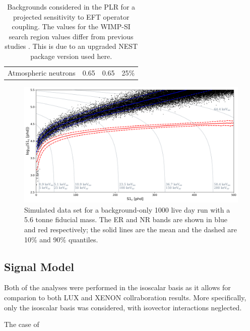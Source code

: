 \begin{table}[]
\begin{tabular}{c|c|c|c}
        Atmospheric neutrons                         & 0.65                   & 0.65                    & 25\% \cite{atmospheric_neutrinos_rate_ref}      
    \end{tabular}
    \caption{Backgrounds considered in the PLR for a projected sensitivity to EFT operator coupling. The values for the WIMP-SI search region values differ from previous studies \cite{LZ_projected_sensitivity_paper_ref,LZ_Ibles_LZStats_Thesis_ref}. This is due to an upgraded NEST package version used here.}
    \label{tab:projected_lz_backgrounds}
\end{table}



\begin{figure}
    \centering
    \includegraphics[width=15cm]{Figures/EFT/Projected_backgrounds/projected_backgrounds_s1_s2.png}
    \caption{Simulated data set for a background-only 1000 live day run with a 5.6 tonne fiducial mass. The ER and NR bands are shown in blue and red respectively; the solid lines are the mean and the dashed are 10\% and 90\% quantiles.}
    \label{fig:my_label}
\end{figure}







\subsection{Signal Model}
\par
\par
Both of the analyses were performed in the isoscalar basis as it allows for comparion to both LUX and XENON collraboration results.
More specifically, only the isoscalar basis was considered, with isovector interactions neglected.
\par
The case of 

